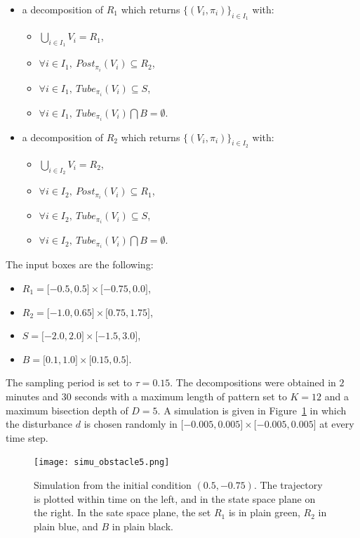 \begin{itemize}
\item a decomposition of $R_1$ which returns $\{ (V_i,\pi_i) \}_{i
    \in I_1}$ with:
  \begin{itemize}
  \item $\bigcup_{i \in I_1} V_i = R_1$,
  \item $\forall i \in I_1, \ Post_{\pi_i}(V_i) \subseteq R_2$,
  \item $\forall i \in I_1, \ Tube_{\pi_i}(V_i) \subseteq S$,
  \item $\forall i \in I_1, \ Tube_{\pi_i}(V_i) \bigcap B = \emptyset$.
  \end{itemize}
\item a decomposition of $R_2$ which returns $\{ (V_i,\pi_i) \}_{i \in
    I_2}$ with:
  \begin{itemize}
  \item $\bigcup_{i \in I_2} V_i = R_2$,
  \item $\forall i \in I_2, \ Post_{\pi_i}(V_i) \subseteq R_1$,
  \item $\forall i \in I_2, \ Tube_{\pi_i}(V_i) \subseteq S$,
  \item $\forall i \in I_2, \ Tube_{\pi_i}(V_i) \bigcap B = \emptyset$.
  \end{itemize}
\end{itemize}

The input boxes are the following:
\begin{itemize}
\item $R_1 = \lbrack -0.5 , 0.5 \rbrack \times \lbrack -0.75 , 0.0
  \rbrack$,
\item $R_2 = \lbrack -1.0 , 0.65 \rbrack \times \lbrack 0.75 , 1.75
  \rbrack$,
\item $S = \lbrack -2.0 , 2.0 \rbrack \times \lbrack -1.5 , 3.0
  \rbrack$,
\item $B = \lbrack 0.1 , 1.0 \rbrack \times \lbrack 0.15 , 0.5
  \rbrack$.
\end{itemize}
The sampling period is set to $\tau = 0.15$. The decompositions were
obtained in $2$ minutes and $30$ seconds with a maximum length of
pattern set to $K = 12$ and a maximum bisection depth of $D = 5$.  A
simulation is given in Figure~\ref{fig:NL_1} in which the disturbance
$d$ is chosen randomly in $\lbrack -0.005,0.005 \rbrack \times \lbrack
-0.005,0.005 \rbrack$ at every time step.

\begin{figure}[t]
 \centering
 \texttt{[image: simu\_obstacle5.png]}
 \caption{Simulation from the initial condition $(0.5,-0.75)$. The
   trajectory is plotted within time on the left, and in the state
   space plane on the right.  In the sate space plane, the set $R_1$
   is in plain green, $R_2$ in plain blue, and $B$ in plain black.}
 \label{fig:NL_1}
\end{figure}

